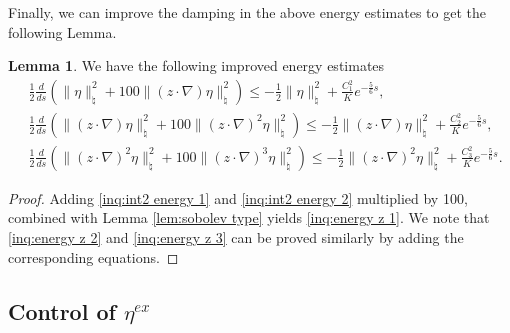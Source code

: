 \documentclass[11pt,reqno]{amsart}
\theoremstyle{definition}
\theoremstyle{bfremark}
\newtheorem{lemma}{Lemma}[section]
\numberwithin{equation}{section}
\begin{document}
Finally, we can improve the damping in the above energy estimates to get the following Lemma.
\begin{lemma} \label{lem:intEngz2}
We have the following improved energy estimates
    \begin{align}
    &\frac{1}{2}\frac{d}{ds}\left(\|\eta\|_{\natural}^2+100\|(z \cdot \nabla)\eta\|_{\natural}^2\right) \leq -\frac{1}{2}\|\eta\|_{\natural}^2+\frac{C_1^2}{K}e^{-\frac{5}{6}s},\label{inq:energy z 1}\\
    &\frac{1}{2}\frac{d}{ds}\left(\|(z \cdot \nabla)\eta\|_{\natural}^2+100\|(z \cdot \nabla)^2\eta\|_{\natural}^2\right) \leq -\frac{1}{2}\|(z \cdot \nabla)\eta\|_{\natural}^2+\frac{C_2^2}{K}e^{-\frac{5}{6}s}, \label{inq:energy z 2}\\
    &\frac{1}{2}\frac{d}{ds}\left(\|(z \cdot \nabla)^2\eta\|_{\natural}^2+100\|(z \cdot \nabla)^3\eta\|_{\natural}^2\right) \leq -\frac{1}{2}\|(z \cdot \nabla)^2\eta\|_{\natural}^2+\frac{C_3^2}{K}e^{-\frac{5}{6}s}.\label{inq:energy z 3}
\end{align}
\end{lemma}
\begin{proof}
    Adding \ref{inq:int2 energy 1} and \ref{inq:int2 energy 2} multiplied by 100, combined with Lemma \ref{lem:sobolev type} yields \ref{inq:energy z 1}. We note that \ref{inq:energy z 2} and \ref{inq:energy z 3} can be proved similarly by adding the corresponding equations.
\end{proof}


\subsection{Control of \(\eta^{ex}\)}
\end{document}
